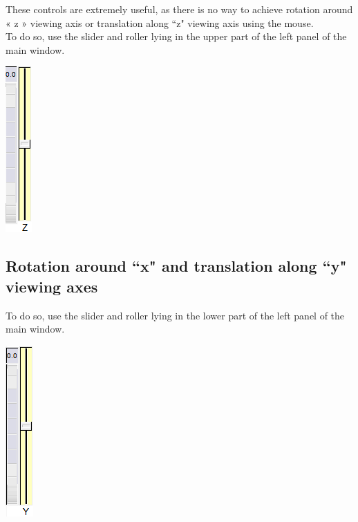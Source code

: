 \begin{minipage}{0.7\textwidth}
These controls are extremely useful, as there is no way to achieve rotation
around « z » viewing axis or translation along ``z" viewing axis using the
mouse. \\
To do so, use the slider and roller lying in the upper part of the left panel of the
main window.

\end{minipage}    
\begin{minipage}{0.25\textwidth}\centering
  \includegraphics[scale=0.5]{images/Icons/x_rot.png}
 \end{minipage}    


\subsection{Rotation around ``x" and translation along ``y" viewing axes}

\begin{minipage}{0.7\textwidth}
To do so, use the slider and roller lying in the lower part of the left panel of the
main window.
\end{minipage}    
\begin{minipage}{0.25\textwidth}\centering
  \includegraphics[scale=0.5]{images/Icons/y_rot.png}
 \end{minipage}   

